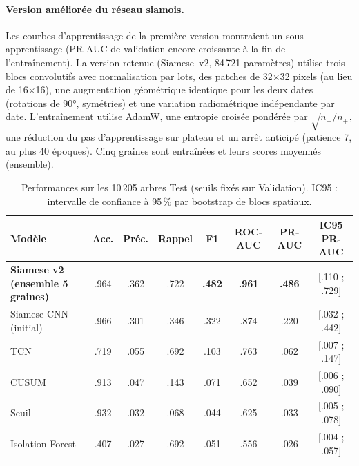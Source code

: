 \paragraph{Version améliorée du réseau siamois.}
Les courbes d'apprentissage de la première version montraient un
sous-apprentissage (PR-AUC de validation encore croissante à la fin de
l'entraînement). La version retenue (Siamese~v2, 84\,721 paramètres)
utilise trois blocs convolutifs avec normalisation par lots, des
patches de 32$\times$32 pixels (au lieu de 16$\times$16), une
augmentation géométrique identique pour les deux dates (rotations de
90°, symétries) et une variation radiométrique indépendante par date.
L'entraînement utilise AdamW, une entropie croisée pondérée par
$\sqrt{n_-/n_+}$, une réduction du pas d'apprentissage sur plateau et
un arrêt anticipé (patience 7, au plus 40 époques). Cinq graines sont
entraînées et leurs scores moyennés (ensemble).


%


\begin{table}[t]
\centering
\caption{Performances sur les 10\,205 arbres Test (seuils fixés sur
Validation). IC95 : intervalle de confiance à 95\,\% par bootstrap
de blocs spatiaux.}
\label{tab:test}
\small
\begin{tabular}{lccccccc}
\toprule
Modèle & Acc. & Préc. & Rappel & F1 & ROC-AUC & PR-AUC & IC95 PR-AUC \\
\midrule
\textbf{Siamese v2 (ensemble 5 graines)} & .964 & .362 & .722 & \textbf{.482} & \textbf{.961} & \textbf{.486} & [.110 ; .729] \\
Siamese CNN (initial)  & .966 & .301 & .346 & .322 & .874 & .220 & [.032 ; .442] \\
TCN                    & .719 & .055 & .692 & .103 & .763 & .062 & [.007 ; .147] \\
CUSUM                  & .913 & .047 & .143 & .071 & .652 & .039 & [.006 ; .090] \\
Seuil                  & .932 & .032 & .068 & .044 & .625 & .033 & [.005 ; .078] \\
Isolation Forest       & .407 & .027 & .692 & .051 & .556 & .026 & [.004 ; .057] \\
\bottomrule
\end{tabular}
\end{table}


